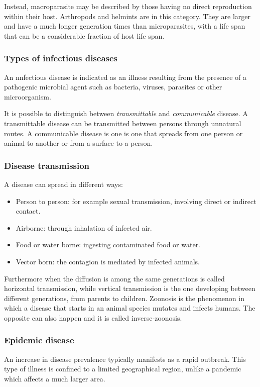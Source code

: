 	Instead, macroparasite may be described by those having no direct reproduction within their host. Arthropods and helmints are in this category. They are larger and have a much longer generation times than microparasites, with a life span that can be a considerable fraction of host life span.
	
\subsubsection{Types of infectious diseases}An nnfectious disease is indicated as an illness resulting from the presence of a pathogenic microbial agent such as bacteria, viruses, parasites or other microorganism.

 It is possible to distinguish between \textit{transmittable} and \textit{communicable} disease. A transmittable disease can be transmitted between persons through unnatural routes. A communicable disease is one is one that spreads from one person or animal to another or from a surface to a person.  

\subsubsection{Disease transmission} A disease can spread in different ways: 
	\begin{itemize}
		\item Person to person: for example sexual transmission, involving direct or indirect contact.
		\item Airborne: through inhalation of infected air.
		\item Food or water borne: ingesting contaminated food or water. 
		\item Vector born: the contagion is mediated by infected animals.
	\end{itemize}
	Furthermore when the diffusion is among the same generations is called horizontal transmission, while vertical transmission is the one developing between different generations, from parents to children. 
	Zoonosis is the phenomenon in which a disease that starts in an animal species mutates and infects humans. The opposite can also happen and it is called inverse-zoonosis. 
	
\subsubsection{Epidemic disease} An increase in disease prevalence typically manifests as a rapid outbreak. This type of illness is confined to a limited geographical region, unlike a pandemic which affects a much larger area.


